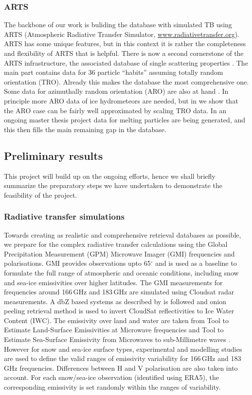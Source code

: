 \documentclass[12pt,oneside,a4paper]{article}
\begin{document}
\subsubsection{ARTS}
\label{sec:arts}
% 
The backbone of our work is buliding the database with simulated TB using ARTS (Atmospheric Radiative Transfer Simulator, \url{www.radiativetransfer.org}). ARTS has some unique features, but in this context it is rather the completeness and flexibility of ARTS that is
helpful. There is now a second cornerstone of the ARTS infrastructure, the
associated database of single scattering properties \citep{eriksson:agene:18}.
The main part contains data for 36 particle ``habits'' assuming totally random
orientation (TRO). Already this makes the database the most comprehensive one.
Some data for azimuthally random orientation (ARO) are also at hand
\citep{brath:micro:20,ekelund:micro:20}. In principle more ARO data of ice
hydrometeors are needed, but in \citet{baralakas:intro:21} we show that the ARO
case can be fairly well approximated by scaling TRO data. In an ongoing master
thesis project data for melting particles are being generated, and this then
fills the main remaining gap in the database.

\subsection{Preliminary results}
%
This project will build up on the ongoing efforts, hence we shall briefly summarize the preparatory steps we have undertaken to demonstrate the feasibility of the project. 

\subsubsection{Radiative transfer simulations}
%
Towards creating as realistic and comprehensive retrieval databases as possible, we prepare for the complex radiative transfer calculations using the Global Precipitation Measurement (GPM) Microwave Imager (GMI) frequencies and polarisations. GMI provides observations upto 65$^{\circ}$ and is used as a baseline to formulate the full range of atmospheric and oceanic conditions, including snow and sea-ice emissivities over higher latitudes. The GMI measurements for frequencies around 166\,GHz and 183\,GHz are simulated using Cloudsat radar measurements. A dbZ based systems as described by \citet{ekelund:using:20} is followed and onion peeling retrieval method is used to invert CloudSat reflectivities to Ice Water Content (IWC). The emissivity over land and water are taken from Tool to Estimate Land-Surface Emissivities at Microwave frequencies \citep{aires} and Tool to Estimate Sea-Surface Emissivity from Microwaves to sub-Millimetre waves \citep{prigent}. However for snow and sea-ice surface types, experimental and modelling studies \citep{harlow:2009:milli, harlow:2012:tundr,hewison:2002:airbo} are used to define the valid ranges of emissivity variability for 166\,GHz and 183 \,GHz frequencies. Differences between H and V polarisation are also taken into account. For each snow/sea-ice observation (identified using ERA5), the corresponding emissivity is set randomly within the ranges of variability.
\end{document}
